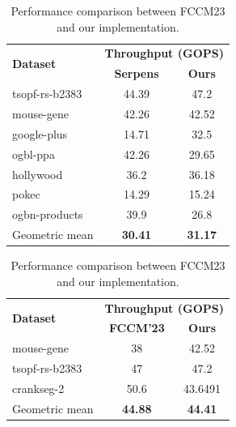 \documentclass[manuscript,screen,review]{acmart}
\begin{document}
\begin{table}[h!]
	\centering
	\begin{minipage}{0.45\textwidth}
		\centering
		\begin{tabular}{|l|c|c|}
			\hline
			\multirow{2}{*}{\textbf{Dataset}} & \multicolumn{2}{c|}{\textbf{Throughput (GOPS)}} \\
			\cline{2-3}
			& \textbf{Serpens} & \textbf{Ours} \\
			\hline
			tsopf-rs-b2383 & 44.39 & 47.2 \\
			mouse-gene & 42.26 & 42.52 \\
			google-plus & 14.71 & 32.5 \\
			ogbl-ppa & 42.26 & 29.65 \\
			hollywood & 36.2 & 36.18 \\
			pokec & 14.29 & 15.24 \\
			ogbn-products & 39.9 & 26.8 \\
			\hline
			Geometric mean & \textbf{30.41} & \textbf{31.17} \\
			\hline
		\end{tabular}
		\caption{Performance comparison between Serpens and our implementation.}
		\label{serpens}
	\end{minipage}
	\hfill
	\begin{minipage}{0.45\textwidth}
		\centering
		\begin{tabular}{|l|c|c|}
			\hline
			\multirow{2}{*}{\textbf{Dataset}} & \multicolumn{2}{c|}{\textbf{Throughput (GOPS)}} \\
			\cline{2-3}
			& \textbf{FCCM'23} & \textbf{Ours} \\
			\hline
			mouse-gene & 38 & 42.52 \\
			tsopf-rs-b2383 & 47 & 47.2 \\
			crankseg-2 & 50.6 & 43.6491 \\
			\hline
			Geometric mean & \textbf{44.88} & \textbf{44.41} \\
			\hline
		\end{tabular}
		\caption{Performance comparison between FCCM23 and our implementation.}
		\label{fccm23}
	\end{minipage}
\end{table}
\end{document}
